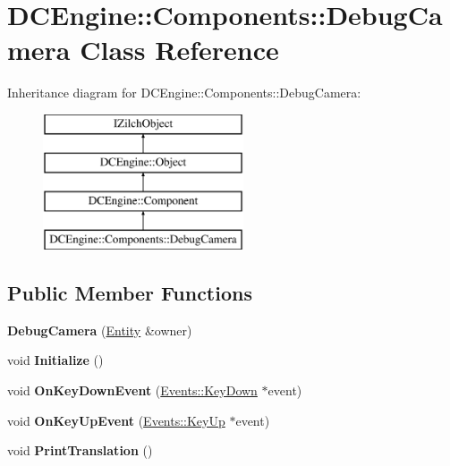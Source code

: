 \hypertarget{classDCEngine_1_1Components_1_1DebugCamera}{\section{D\-C\-Engine\-:\-:Components\-:\-:Debug\-Camera Class Reference}
\label{classDCEngine_1_1Components_1_1DebugCamera}
}
Inheritance diagram for D\-C\-Engine\-:\-:Components\-:\-:Debug\-Camera\-:\begin{figure}[H]
\begin{center}
\leavevmode
\includegraphics[height=4.000000cm]{classDCEngine_1_1Components_1_1DebugCamera}
\end{center}
\end{figure}
\subsection*{Public Member Functions}
\begin{DoxyCompactItemize}
\item 
\hypertarget{classDCEngine_1_1Components_1_1DebugCamera_a7aba3c7de5f17f4633fd39c5866228b7}{{\bfseries Debug\-Camera} (\hyperlink{classDCEngine_1_1Entity}{Entity} \&owner)}\label{classDCEngine_1_1Components_1_1DebugCamera_a7aba3c7de5f17f4633fd39c5866228b7}

\item 
\hypertarget{classDCEngine_1_1Components_1_1DebugCamera_a993bc1ebff7b239dc056767f77f05b0f}{void {\bfseries Initialize} ()}\label{classDCEngine_1_1Components_1_1DebugCamera_a993bc1ebff7b239dc056767f77f05b0f}

\item 
\hypertarget{classDCEngine_1_1Components_1_1DebugCamera_a1eec4e7cd651522d4bbb9058c3ceaf76}{void {\bfseries On\-Key\-Down\-Event} (\hyperlink{classDCEngine_1_1Events_1_1KeyDown}{Events\-::\-Key\-Down} $\ast$event)}\label{classDCEngine_1_1Components_1_1DebugCamera_a1eec4e7cd651522d4bbb9058c3ceaf76}

\item 
\hypertarget{classDCEngine_1_1Components_1_1DebugCamera_ac26e2cb348c00207bef401d0c2105e88}{void {\bfseries On\-Key\-Up\-Event} (\hyperlink{classDCEngine_1_1Events_1_1KeyUp}{Events\-::\-Key\-Up} $\ast$event)}\label{classDCEngine_1_1Components_1_1DebugCamera_ac26e2cb348c00207bef401d0c2105e88}

\item 
\hypertarget{classDCEngine_1_1Components_1_1DebugCamera_a5fe8a650881c6ac60fe50667f67899fb}{void {\bfseries Print\-Translation} ()}\label{classDCEngine_1_1Components_1_1DebugCamera_a5fe8a650881c6ac60fe50667f67899fb}

\end{DoxyCompactItemize}
